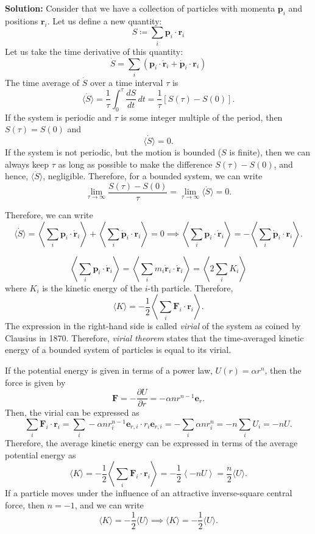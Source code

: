 \documentclass[12pt]{article}
\begin{document}
\textbf{Solution:}
Consider that we have a collection of particles with momenta $\mathbf{p}_i$ and positions $\mathbf{r}_i$. Let us define a new quantity:
\[
S \coloneqq \sum_i \mathbf{p}_i \cdot \mathbf{r}_i
\]
Let us take the time derivative of this quantity:
\[
\dot{S} = \sum_i \left(\mathbf{p}_i \cdot \dot{\mathbf{r}}_i + \dot{\mathbf{p}}_i \cdot \mathbf{r}_i\right)
\]
The time average of $\dot{S}$ over a time interval $\tau$ is
\[
\langle \dot{S} \rangle = \frac{1}{\tau}\int_0^\tau \frac{dS}{dt}\,dt = \frac{1}{\tau}\left[S(\tau)-S(0)\right].
\]
If the system is periodic and $\tau$ is some integer multiple of the period, then $S(\tau)=S(0)$ and
\[
\langle \dot{S} \rangle = 0.
\]
If the system is not periodic, but the motion is bounded ($S$ is finite), then we can always keep $\tau$ as long as possible to make the difference $S(\tau)-S(0)$, and hence, $\langle \dot{S} \rangle$, negligible. Therefore, for a bounded system, we can write
\[
\lim_{\tau\to\infty}\frac{S(\tau)-S(0)}{\tau} = \lim_{\tau \to \infty} \langle \dot{S} \rangle  = 0.
\]

Therefore, we can write
\[
\langle \dot{S} \rangle = \left < \sum_i  \mathbf{p}_i \cdot \dot{\mathbf{r}}_i \right > + \left  <\sum_i \dot{\mathbf{p}}_i \cdot \mathbf{r}_i \right > = 0 \implies \left < \sum_i  \mathbf{p}_i \cdot \dot{\mathbf{r}}_i \right > = -\left  <\sum_i \dot{\mathbf{p}}_i \cdot \mathbf{r}_i \right >.
\]

\[
\left < \sum_i  \mathbf{p}_i \cdot \dot{\mathbf{r}}_i \right > = \left < \sum_i  m_i \dot{\mathbf{r}}_i \cdot \dot{\mathbf{r}}_i \right > =  \left < 2 \sum_i  K_i \right >
\]
where $K_i$ is the kinetic energy of the $i$-th particle. Therefore,
\[
\langle K \rangle = -\frac{1}{2} \left  <\sum_i \mathbf{F}_i \cdot \mathbf{r}_i \right >.
\]
The expression in the right-hand side is called \emph{virial} of the system as coined by Clausius in 1870. Therefore, \emph{virial theorem} states that the time-averaged kinetic energy of a bounded system of particles is equal to its virial.

If the potential energy is given in terms of a power law, $U(r) = \alpha r^n$, then the force is given by
\[
\mathbf{F} = -\frac{\partial U}{\partial r} = -\alpha n r^{n-1}\mathbf{e}_r.
\]
Then, the virial can be expressed as
\[
\sum_i \mathbf{F}_i \cdot \mathbf{r}_i = \sum_i -\alpha n r_i^{n-1}\mathbf{e}_{r,i} \cdot r_i\mathbf{e}_{r,i} = -\sum_i \alpha n r_i^n = -n \sum_i U_i = -n U.
\]
Therefore, the average kinetic energy can be expressed in terms of the average potential energy as
\[
\langle K \rangle = -\frac{1}{2} \left <\sum_i \mathbf{F}_i \cdot \mathbf{r}_i \right > = -\frac{1}{2} \left < -n U \right > = \frac{n}{2} \langle U \rangle.
\]
If a particle moves under the influence of an attractive inverse-square central force, then $n = -1$, and we can write
\[
\langle K \rangle = -\frac{1}{2} \langle U \rangle \implies \langle K \rangle = -\frac{1}{2} \langle U \rangle.
\]
\end{document}
